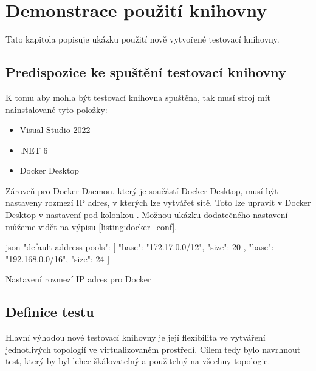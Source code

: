 \chapter{Demonstrace použití knihovny}

Tato kapitola popisuje ukázku použití nově vytvořené testovací knihovny.


\section{Predispozice ke spuštění testovací knihovny}\label{sec:test_requirements}

K tomu aby mohla být testovací knihovna spuštěna, tak musí stroj mít nainstalované tyto položky:

\begin{itemize}
    \item Visual Studio 2022
    \item .NET 6
    \item Docker Desktop
\end{itemize}

Zároveň pro Docker Daemon, který je součástí Docker Desktop, musí být nastaveny rozmezí IP adres, v kterých lze vytvářet sítě. Toto lze upravit v Docker Desktop v nastavení pod kolonkou . Možnou ukázku dodatečného nastavení můžeme vidět na výpisu \ref{listing:docker_conf}. 

\begin{listing}[htbp]
    \centering
    \begin{cminted}{json}
        "default-address-pools": [
            {
              "base": "172.17.0.0/12",
              "size": 20
            },
            {
              "base": "192.168.0.0/16",
              "size": 24
            }
          ]
    \end{cminted}
\caption{Nastavení rozmezí IP adres pro Docker}
\label{listing:docker_conf}
\end{listing}


\section{Definice testu}\label{sec:modbus_test}

Hlavní výhodou nové testovací knihovny je její flexibilita ve vytváření jednotlivých topologií ve virtualizovaném prostředí. Cílem tedy bylo navrhnout test, který by byl lehce škálovatelný a použitelný na všechny topologie. 

